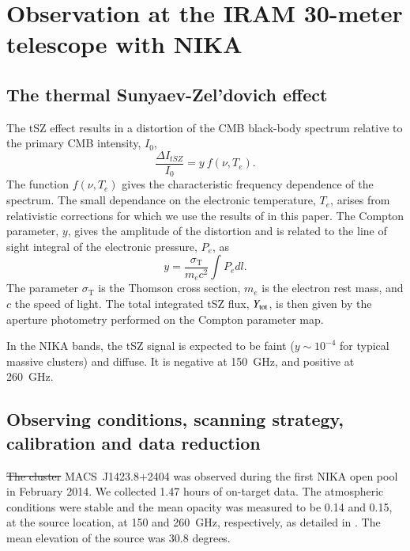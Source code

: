 \documentclass[twocolumn,traditabstract]{aa}
\providecommand{\DIFdeltex}[1]{{\protect\color{red}\sout{#1}}}                      %
\providecommand{\DIFdelbegin}{} %
\providecommand{\DIFdelend}{} %
\providecommand{\DIFdel}[1]{\texorpdfstring{\DIFdeltex{#1}}{}} %
\begin{document}
\section{Observation at the IRAM 30-meter telescope with NIKA}\label{sec:Observation_at_the_IRAM_30m_telescope_with_NIKA}
\subsection{The thermal Sunyaev-Zel'dovich effect}
The tSZ effect \citep{sunyaev1972,sunyaev1980} results in a distortion of the CMB black-body spectrum relative to the primary CMB intensity, $I_0$, \citep[e.g.][]{birkinshaw1999}
\begin{equation}
	\frac{\Delta I_{tSZ}}{I_0} = y \ f(\nu, T_e).
\label{eq:deltaI}
\end{equation}
The function $f(\nu, T_e)$ gives the characteristic frequency dependence of the spectrum. The small dependance on the electronic temperature, $T_e$, arises from relativistic corrections for which we use the results of \cite{itoh1998} in this paper. The Compton parameter, $y$, gives the amplitude of the distortion and is related to the line of sight integral of the electronic pressure, $P_e$, as 
\begin{equation}
	y = \frac{\sigma_{\mathrm{T}}}{m_{e} c^2} \int P_{e} dl.
	\label{eq:y_compton}
\end{equation}
The parameter $\sigma_{\mathrm{T}}$ is the Thomson cross section, $m_{e}$ is the electron rest mass, and $c$ the speed of light. The total integrated tSZ flux, $Y_{\rm tot}$, is then given by the aperture photometry performed on the Compton parameter map.

In the NIKA bands, the tSZ signal is expected to be faint ($y \sim 10^{-4}$ for typical massive clusters) and diffuse. It is negative at 150~GHz, and positive at 260~GHz.

\subsection{Observing conditions, scanning strategy, calibration and data reduction}
\DIFdelbegin \DIFdel{The cluster }\DIFdelend \mbox{MACS~J1423.8+2404} was observed during the first NIKA open pool in February 2014. We collected 1.47 hours of on-target data. The atmospheric conditions were stable and the mean opacity was measured to be 0.14 and 0.15, at the source location, at 150 and 260~GHz, respectively, as detailed in \cite{catalano2014}. The mean elevation of the source was 30.8 degrees.
\end{document}
